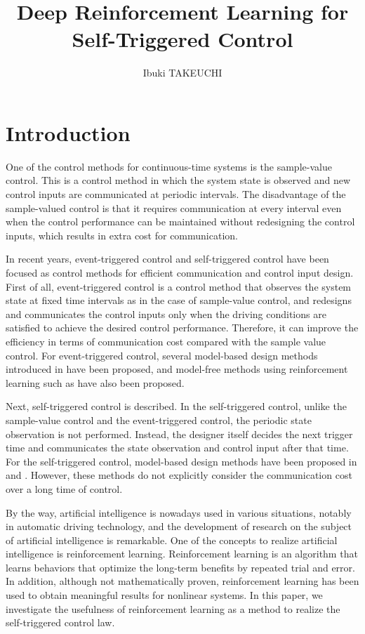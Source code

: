 \documentclass[english, dvipdfmx]{ampmt}             %
\title[Deep Reinforcement Learning for Self-Triggered Control]
      {Deep Reinforcement Learning for Self-Triggered Control}
\author{Ibuki TAKEUCHI}
\begin{document}
\ifoutputbody
\makeinsidecover                %
\makeabstract                   %
\maketoc                        %
\setcounter{page}{1}
\section{Introduction}
One of the control methods for continuous-time systems is the sample-value control. This is a control method in which the system state is observed and new control inputs are communicated at periodic intervals. The disadvantage of the sample-valued control is that it requires communication at every interval even when the control performance can be maintained without redesigning the control inputs, which results in extra cost for communication.\par
In recent years, event-triggered control and self-triggered control have been focused as control methods for efficient communication and control input design. First of all, event-triggered control is a control method that observes the system state at fixed time intervals as in the case of sample-value control, and redesigns and communicates the control inputs only when the driving conditions are satisfied to achieve the desired control performance. Therefore, it can improve the efficiency in terms of communication cost compared with the sample value control. For event-triggered control, several model-based design methods introduced in \cite{ETC_intro} have been proposed, and model-free methods using reinforcement learning such as \cite{ETC} have also been proposed.\par
Next, self-triggered control is described. In the self-triggered control, unlike the sample-value control and the event-triggered control, the periodic state observation is not performed. Instead, the designer itself decides the next trigger time and communicates the state observation and control input after that time. For the self-triggered control, model-based design methods have been proposed in \cite{STC} and \cite{ECBF}. However, these methods do not explicitly consider the communication cost over a long time of control.\par
By the way, artificial intelligence is nowadays used in various situations, notably in automatic driving technology, and the development of research on the subject of artificial intelligence is remarkable. One of the concepts to realize artificial intelligence is reinforcement learning. Reinforcement learning is an algorithm that learns behaviors that optimize the long-term benefits by repeated trial and error. In addition, although not mathematically proven, reinforcement learning has been used to obtain meaningful results for nonlinear systems. In this paper, we investigate the usefulness of reinforcement learning as a method to realize the self-triggered control law. \par
\end{document}
